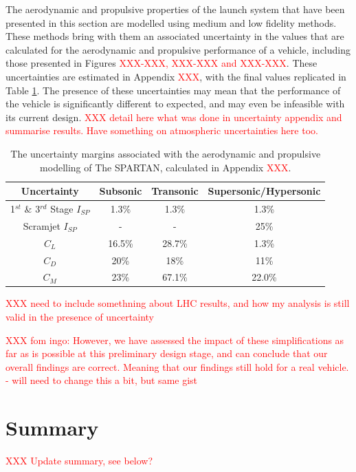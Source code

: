 The aerodynamic and propulsive properties of the launch system that have been presented in this section are modelled using medium and low fidelity methods. These methods bring with them an associated uncertainty in the values that are calculated for the aerodynamic and propulsive performance of a vehicle, including those presented in Figures \textcolor{red}{XXX-XXX, XXX-XXX and XXX-XXX}. These uncertainties are estimated in Appendix \textcolor{red}{XXX}, with the final values replicated in Table \ref{tab:AppendixUncertaintyCopy}. The presence of these uncertainties may mean that the performance of the vehicle is significantly different to expected, and may even be infeasible with its current design. \textcolor{red}{XXX detail here what was done in uncertainty appendix and summarise results. Have something on atmospheric uncertainties here too.}

\begin{table}[ht]
	\centering
	\begin{tabular}{|c|c|c|c|}
		\hline  Uncertainty & Subsonic & Transonic  & Supersonic/Hypersonic \\ 
		\hline  1$^{st}$ \& 3$^{rd}$ Stage $I_{SP}$ & 1.3\% & 1.3\% &  1.3\% \\ 
		\hline  Scramjet $I_{SP}$ & - & - &  25\% \\ 
		\hline   $C_L$ & 16.5\% & 28.7\% & 1.3\% \\  
		\hline   $C_D$ & 20\% & 18\% & 11\% \\  
		\hline   $C_M$  & 23\% & 67.1\% &  22.0\% \\ 
		\hline 
	\end{tabular}
	\caption{The uncertainty margins associated with the aerodynamic and propulsive modelling of The SPARTAN, calculated in Appendix \textcolor{red}{XXX}.}
	\label{tab:AppendixUncertaintyCopy}
\end{table}

\textcolor{red}{XXX need to include somethning about LHC results, and how my analysis is still valid in the presence of uncertainty}

\textcolor{red}{XXX fom ingo: However, we have assessed the impact of these simplifications as far as is possible at this preliminary design stage, and can conclude that our overall findings are correct. Meaning that our findings still hold for a real vehicle. - will need to change this a bit, but same gist}  

	\section{Summary}	
	\textcolor{red}{XXX Update summary, see below?}
	

